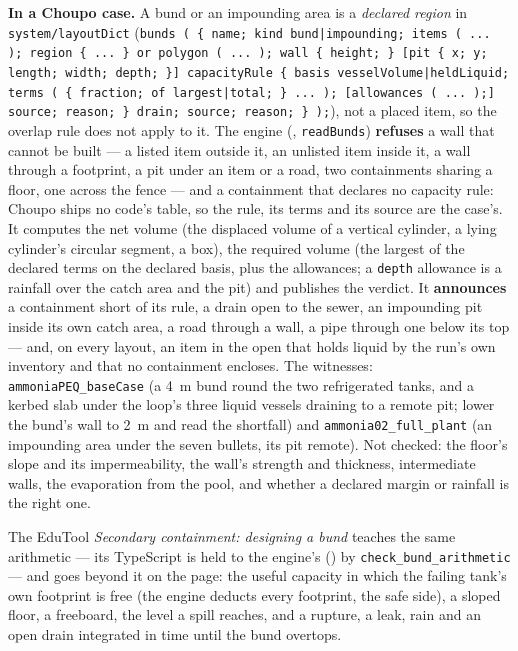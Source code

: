 \documentclass[11pt,a4paper]{article}
\begin{document}
\textbf{In a Choupo case.} A bund or an impounding area is a
\emph{declared region} in \texttt{system/layoutDict} (\texttt{bunds (
\{ name; kind bund|impounding; items ( ... ); region \{ ... \} or
polygon ( ... ); wall \{ height; \} [pit \{ x; y; length; width; depth;
\}] capacityRule \{ basis vesselVolume|heldLiquid; terms ( \{
fraction; of largest|total; \} ... ); [allowances ( ... );] source;
reason; \} drain; source; reason; \} );}), not a placed item, so the
overlap rule does not apply to it. The engine
(, \texttt{readBunds})
\textbf{refuses} a wall that cannot be built --- a listed item outside
it, an unlisted item inside it, a wall through a footprint, a pit
under an item or a road, two containments sharing a floor, one across
the fence --- and a containment that declares no capacity rule: Choupo
ships no code's table, so the rule, its terms and its source are the
case's. It computes the net volume (the displaced volume of a vertical
cylinder, a lying cylinder's circular segment, a box), the required
volume (the largest of the declared terms on the declared basis, plus
the allowances; a \texttt{depth} allowance is a rainfall over the catch
area and the pit) and publishes the verdict. It \textbf{announces} a
containment short of its rule, a drain open to the sewer, an impounding
pit inside its own catch area, a road through a wall, a pipe through
one below its top --- and, on every layout, an item in the open that
holds liquid by the run's own inventory and that no containment
encloses. The witnesses: \texttt{ammoniaPEQ\_baseCase} (a 4~m
bund round the two refrigerated tanks, and a kerbed slab under the
loop's three liquid vessels draining to a remote pit; lower the bund's
wall to 2~m and read the shortfall) and \texttt{ammonia02\_full\_plant}
(an impounding area under the seven bullets, its pit remote). Not
checked: the floor's slope and its impermeability, the wall's strength
and thickness, intermediate walls, the evaporation from the pool, and
whether a declared margin or rainfall is the right one.

The EduTool \emph{Secondary containment: designing a bund} teaches the
same arithmetic --- its TypeScript is held to the engine's
() by
\texttt{check\_bund\_arithmetic} --- and goes beyond it on the page: the
useful capacity in which the failing tank's own footprint is free (the
engine deducts every footprint, the safe side), a sloped floor, a
freeboard, the level a spill reaches, and a rupture, a leak, rain and
an open drain integrated in time until the bund overtops.
\end{document}
